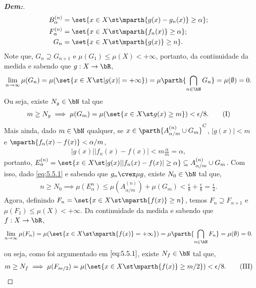 \begin{proof}[\textbf{Dem:}]
\begin{align*}
    B_\alpha^{(n)} &= \set{x \in X \st \mparth{g(x) - g_n(x)} \ge \alpha};\\
    F_\alpha^{(n)} &= \set{x \in X \st \mparth{f_n(x)} \ge \alpha};\\
    G_n &= \set{x \in X \st \mparth{g(x)} \ge n}.
  \end{align*}
  Note que, $G_n \supseteq G_{n+1}$ e $\mu(G_1)\le \mu(X) <+\infty$, portanto,
  da continuidade da medida
  e sabendo que $g: X \rightarrow \bR$, 
  \begin{align*}
    \lim_{n \rightarrow \infty} \mu(G_n) = \mu(\set{x \in X \st |g(x)| = +\infty})
    =\mu\parth{\bigcap_{n \in \bN} G_n} =\mu(\emptyset) = 0.
  \end{align*}
  Ou seja, existe $N_g \in \bN$ tal que 
  \begin{align*}
    m \ge N_g \implies \mu(G_m) = \mu(\set{x \in X \st g(x) \ge m}) < \epsilon/8.
    \tag{I}
    \label{eq:5.5.1}
  \end{align*}
  Mais ainda, dado $m \in \bN$ qualquer,
  se $x \in \parth{A_{\alpha/m}^{(n)} \cup G_m}^C$, $|g(x)| < m$ 
  e $\mparth {f_n(x) - f(x)} < \alpha/m$,
  \begin{align*}
    |g(x)||f_n(x) - f(x)| < m\frac{\alpha}{m} = \alpha,
  \end{align*}
  portanto, $E_\alpha^{(n)} 
  = \set{x \in X \st |g(x)||f_n(x) - f(x)|\ge \alpha} \subseteq A_{\alpha/m}^{(n)} \cup G_m$. 
  Com isso, dado \eqref{eq:5.5.1} e sabendo que $g_n \cvex \mu g$,
  existe $N_0 \in \bN$ tal que, 
  \begin{align*}
    n \ge N_0 \implies \mu(E_{\alpha}^{n}) \le \mu(A_{\alpha/m}^{(n)}) + \mu(G_m) < 
    \frac{\epsilon}{8} + \frac{\epsilon}{8} = \frac{\epsilon}{4}.
    \tag{II}
    \label{eq:5.5.2}
  \end{align*}
  Agora, definindo $F_{n} = \set{x \in X \st \mparth{f(x)}\ge n}$, temos
  $F_n \supseteq F_{n+1}$ e $\mu(F_1) \le \mu(X)<+\infty$. Da continuidade 
  da medida e sabendo que $f: X \rightarrow \bR$, 
  \begin{align*}
    \lim_{n \rightarrow \infty} \mu(F_{n}) 
    = \mu(\set{x \in X \st \mparth{f(x)}= +\infty})
    =\mu\parth{\bigcap_{n \in \bN} F_n} =\mu(\emptyset) = 0.
  \end{align*}
  ou seja, como foi argumentado em $\eqref{eq:5.5.1}$, existe $N_f \in \bN$ 
  tal que, 
  \begin{align*}
      m \ge N_f \implies \mu(F_{m/2}) 
      = \mu(\set{x \in X \st \mparth{f(x)}\ge m/2}) < \epsilon/8.
    \tag{III}
    \label{eq:5.5.3}
  \end{align*}

\end{proof}
